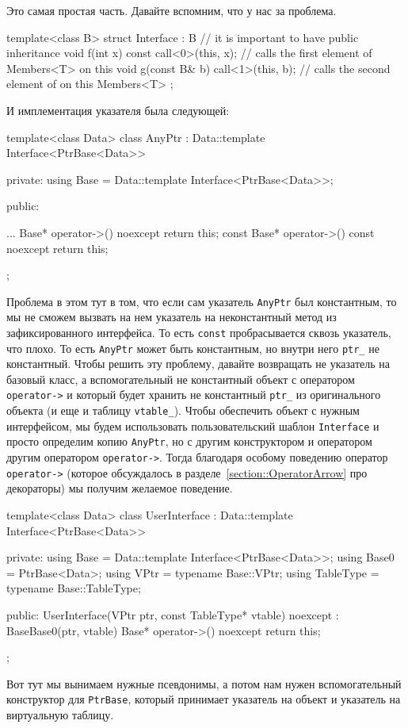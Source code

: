 Это самая простая часть.
Давайте вспомним, что у нас за проблема.
\begin{cppcode}
template<class B>
struct Interface : B { // it is important to have public inheritance
  void f(int x) const {
    call<0>(this, x); // calls the first element of Members<T> on this
  }
  void g(const B& b) {
    call<1>(this, b); // calls the second element of on this Members<T>
  }
};
\end{cppcode}
И имплементация указателя была следующей:
\begin{cppcode}
template<class Data>
class AnyPtr : Data::template Interface<PtrBase<Data>> {
private:
  using Base = Data::template Interface<PtrBase<Data>>;

public:

  ...
  Base* operator->() noexcept {
    return this;
  }
  const Base* operator->() const noexcept {
    return this;
  }
};
\end{cppcode}
Проблема в этом тут в том, что если сам указатель \verb"AnyPtr" был константным, то мы не сможем вызвать на нем указатель на неконстантный метод из зафиксированного интерфейса.
То есть \verb"const" пробрасывается сквозь указатель, что плохо.
То есть \verb"AnyPtr" может быть константным, но внутри него \verb"ptr_" не константный.
Чтобы решить эту проблему, давайте возвращать не указатель на базовый класс, а вспомогательный не константный объект с оператором \verb"operator->" и который будет хранить не константный \verb"ptr_" из оригинального объекта (и еще и таблицу \verb"vtable_").
Чтобы обеспечить объект с нужным интерфейсом, мы будем использовать пользовательский шаблон \verb"Interface" и просто определим копию \verb"AnyPtr", но с другим конструктором и оператором другим оператором \verb"operator->".
Тогда благодаря особому поведению оператор \verb"operator->" (которое обсуждалось в разделе~\ref{section::OperatorArrow} про декораторы) мы получим желаемое поведение.
\begin{cppcode}
template<class Data>
class UserInterface : Data::template Interface<PtrBase<Data>> {
private:
  using Base = Data::template Interface<PtrBase<Data>>;
  using Base0 = PtrBase<Data>;
  using VPtr = typename Base::VPtr;
  using TableType = typename Base::TableType;

public:
  UserInterface(VPtr ptr, const TableType* vtable) noexcept
      : Base{Base0(ptr, vtable)} {
  }
  Base* operator->() noexcept {
    return this;
  }
};
\end{cppcode}
Вот тут мы вынимаем нужные псевдонимы, а потом нам нужен вспомогательный конструктор для \verb"PtrBase", который принимает указатель на объект и указатель на виртуальную таблицу.
